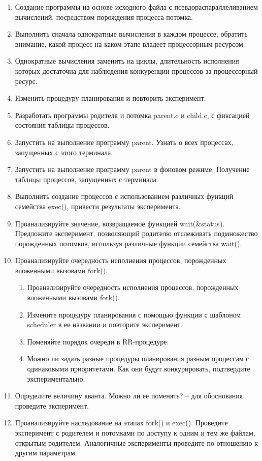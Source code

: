 \documentclass[14pt,a4paper,report]{report}
\begin{document}
\begin{enumerate}
	\item Создание программы на основе исходного файла с псевдораспараллеливанием вычислений, посредством порождения процесса-потомка.
	\item Выполнить сначала однократные вычисления в каждом процессе, обратить внимание, какой процесс на каком этапе владеет процессорным ресурсом.
	\item Однократные вычисления заменить на циклы, длительность исполнения которых достаточна для наблюдения конкуренции процессов за процессорный ресурс.
	\item Изменить процедуру планирования и повторить эксперимент.
	\item Разработать программы родителя и потомка parent.c и child.c, с фиксацией состояния таблицы процессов.
	\item Запустить на выполнение программу parent. Узнать о всех процессах, запущенных с этого терминала.
	\item Запустить на выполнение программу parent в фоновом режиме. Получение таблицы процессов, запущенных с терминала.
	\item Выполнить создание процессов с использованием различных функций семейства exec(), привести результаты эксперимента.
	\item Проанализируйте значение, возвращаемое функцией wait(\&status). Предложите эксперимент, позволяющий родителю отслеживать подмножество порожденных потомков, используя различные функции семейства wait().
	\item Проанализируйте очередность исполнения процессов, порожденных вложенными вызовами fork().
	\begin{enumerate}
		\item Проанализируйте очередность исполнения процессов, порожденных вложенными вызовами fork().
		\item Измените процедуру планирования с помощью функции с шаблоном scheduler в ее названии и повторите эксперимент.
		\item Поменяйте порядок очереди в RR-процедуре.
		\item Можно ли задать разные процедуры планирования разным процессам с одинаковыми приоритетами. Как они будут конкурировать, подтвердите экспериментально.
	\end{enumerate}
	\item Определите величину кванта. Можно ли ее поменять? – для обоснования проведите эксперимент.
	\item Проанализируйте наследование на этапах fork() и exec(). Проведите эксперимент с родителем и потомками по доступу к одним и тем же файлам, открытым родителем. Аналогичные эксперименты проведите по отношению к другим параметрам.	
\end{enumerate}
\end{document}
